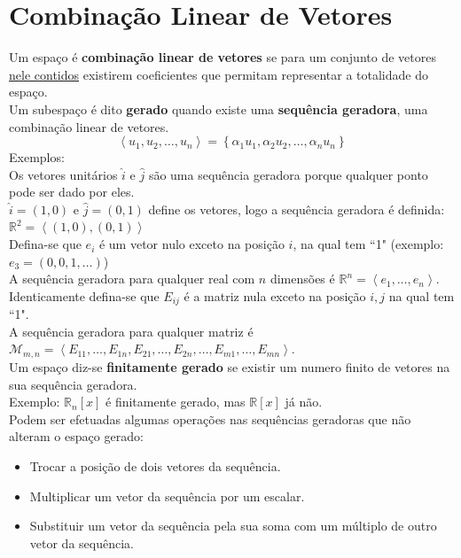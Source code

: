 \documentclass[]{report}
\begin{document}
\section{Combinação Linear de Vetores}
Um espaço é \textbf{combinação linear de vetores} se para um conjunto de vetores \underline{nele contidos} existirem coeficientes que permitam representar a totalidade do espaço.\\[2mm]
Um subespaço é dito \textbf{gerado} quando existe uma \textbf{sequência geradora}, uma combinação linear de vetores.
$$\left\langle u_1, u_2, \dots, u_n \right\rangle = \left\lbrace \alpha_1 u_1, \alpha_2 u_2, \dots, \alpha_n u_n \right\rbrace$$
Exemplos:\\
Os vetores unitários $\hat{i}$ e $\hat{j}$ são uma sequência geradora porque qualquer ponto pode ser dado por eles.\\
$\hat{i} = (1, 0)$ e $\hat{j} = (0, 1)$ define os vetores, logo a sequência geradora é definida: $\mathbb{R}^2 = \left\langle(1,0),(0,1)\right\rangle$\\[2mm]
Defina-se que $e_i$ é um vetor nulo exceto na posição $i$, na qual tem ``1" (exemplo: $e_3 = (0, 0, 1, \dots)$)\\
A sequência geradora para qualquer real com $n$ dimensões é $\mathbb{R}^n=\left\langle e_1, \dots, e_n\right\rangle$.\\[2mm]
Identicamente defina-se que $E_{ij}$ é a matriz nula exceto na posição $i,j$ na qual tem  ``1".\\
A sequência geradora para qualquer matriz é $\mathcal{M}_{m, n}=\left\langle E_{11}, \dots,  E_{1n}, E_{21}, \dots, E_{2n}, \dots, E_{m1}, \dots, E_{mn} \right\rangle$.\\[5mm]
Um espaço diz-se \textbf{finitamente gerado} se existir um numero finito de vetores na sua sequência geradora.\\
Exemplo: $\mathbb{R}_n[x]$ é finitamente gerado, mas $\mathbb{R}[x]$ já não.\\[2mm]
Podem ser efetuadas algumas operações nas sequências geradoras que não alteram o espaço gerado:
\begin{itemize}
\item Trocar a posição de dois vetores da sequência.
\item Multiplicar um vetor da sequência por um escalar.
\item Substituir um vetor da sequência pela sua soma com um múltiplo de outro vetor da sequência.
\end{itemize}
\end{document}
